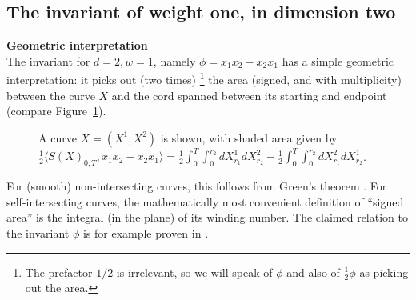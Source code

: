 \documentclass{scrartcl}
\theoremstyle{plain}
\theoremstyle{definition}
\newcommand{\1}[1]{1_{\{#1\}}}
\newcommand{\ds}{d} %
\begin{document}
\subsection{The invariant of weight one, in dimension two}
\label{sec:d2w1}

\textbf{Geometric interpretation}\\
The invariant for $\ds=2,w=1$, namely $\phi = x_1 x_2 - x_2 x_1$
has a simple geometric interpretation: it picks out (two times)%
\footnote
{
  The prefactor $1/2$ is irrelevant, so we will speak of $\phi$ and also of $\tfrac12 \phi$
  as picking out the area.
}
the area (signed, and with multiplicity)
between the curve $X$ and the cord spanned between its starting and endpoint (compare Figure~\ref{fig:area}).
\begin{figure}[h]
  \centering
  \caption{
    A curve $X = (X^1, X^2)$ is shown,
    with shaded area given by
    $\frac{1}{2} \langle S(X)_{0,T}, x_1 x_2 - x_2 x_1 \rangle
    =
    \frac{1}{2} \int_0^T \int_0^{r_2} dX^1_{r_1} dX^2_{r_2} - 
    \frac{1}{2} \int_0^T \int_0^{r_2} dX^2_{r_1} dX^1_{r_2}$.
    }
    \label{fig:area}
\end{figure}
For (smooth) non-intersecting curves, this follows from Green's theorem \cite[Theorem 10.33]{bib:Rud1964}.
%
For self-intersecting curves, the mathematically most convenient definition
of ``signed area'' is the integral (in the plane) of its winding number.
The claimed relation to the invariant $\phi$ is for example proven in 
\cite[Proposition 1]{bib:LY2006}.
\end{document}
